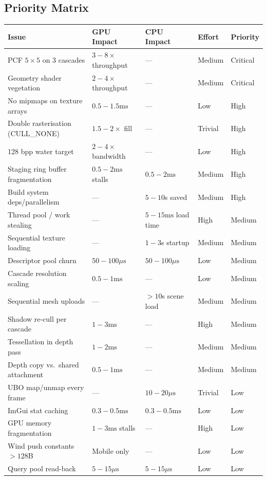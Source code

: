 \documentclass[11pt,a4paper]{article}
\newcommand{\ms}{\ensuremath{\text{ms}}}
\newcommand{\us}{\ensuremath{\mu\text{s}}}
\begin{document}
\subsection{Priority Matrix}

\begin{center}
\begin{tabular}{lp{3.5cm}p{3.5cm}p{2.5cm}p{2.5cm}}
\toprule
\textbf{Issue} & \textbf{GPU Impact} & \textbf{CPU Impact} &
\textbf{Effort} & \textbf{Priority} \\
\midrule
PCF $5\times5$ on 3 cascades & $3{-}8\times$ throughput & --- & Medium &
Critical \\
Geometry shader vegetation & $2{-}4\times$ throughput & --- & Medium & Critical \\
No mipmaps on texture arrays & $0.5{-}1.5\ms$ & --- & Low & High \\
Double rasterisation (CULL\_NONE) & $1.5{-}2\times$ fill & --- & Trivial &
High \\
128 bpp water target & $2{-}4\times$ bandwidth & --- & Low & High \\
Staging ring buffer fragmentation & $0.5{-}2\ms$ stalls & $0.5{-}2\ms$ &
Medium & High \\
Build system deps/parallelism & --- & $5{-}10$s saved & Medium & High \\
Thread pool / work stealing & --- & $5{-}15\ms$ load time & High & Medium \\
Sequential texture loading & --- & $1{-}3$s startup & Medium & Medium \\
Descriptor pool churn & $50{-}100\us$ & $50{-}100\us$ & Low & Medium \\
Cascade resolution scaling & $0.5{-}1\ms$ & --- & Low & Medium \\
Sequential mesh uploads & --- & $>10$s scene load & Medium & Medium \\
Shadow re-cull per cascade & $1{-}3\ms$ & --- & High & Medium \\
Tessellation in depth pass & $1{-}2\ms$ & --- & Medium & Medium \\
Depth copy vs.\ shared attachment & $0.5{-}1\ms$ & --- & Medium & Medium \\
UBO map/unmap every frame & --- & $10{-}20\us$ & Trivial & Low \\
ImGui stat caching & $0.3{-}0.5\ms$ & $0.3{-}0.5\ms$ & Low & Low \\
GPU memory fragmentation & $1{-}3\ms$ stalls & --- & High & Low \\
Wind push constants $>128$B & Mobile only & --- & Low & Low \\
Query pool read-back & $5{-}15\us$ & $5{-}15\us$ & Low & Low \\
\bottomrule
\end{tabular}
\end{center}
\end{document}
